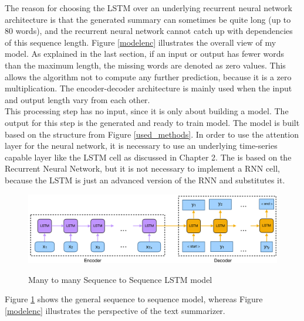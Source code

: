 The reason for choosing the LSTM over an underlying recurrent neural network architecture is that the generated summary can sometimes be quite long (up to 80 words), and the recurrent neural network cannot catch up with dependencies of this sequence length. Figure \ref{modelenc} illustrates the overall view of my model. 
As explained in the last section, if an input or output has fewer words than the maximum length, the missing words are denoted as zero values. This allows the algorithm not to compute any further prediction, because it is a zero multiplication. The encoder-decoder architecture is mainly used when the input and output length vary from each other. \\

This processing step has no input, since it is only about building a model. The output for this step is the generated and ready to train model. 
The model is built based on the structure from Figure \ref{used_methods}. In order to use the attention layer for the neural network, it is necessary to use an underlying time-series capable layer like the LSTM cell as discussed in Chapter 2. The is based on the Recurrent Neural Network, but it is not necessary to implement a RNN cell, because the LSTM is just an advanced version of the RNN and substitutes it. 

\begin{figure}
	\begin{center}
		\includegraphics[width=6in]{photos/build-1}\\
		\caption{Many to many Sequence to Sequence LSTM model}\label{build_model}
	\end{center}
\end{figure}

Figure \ref{build_model} shows the general sequence to sequence model, whereas Figure \ref{modelenc} illustrates the perspective of the text summarizer. 

